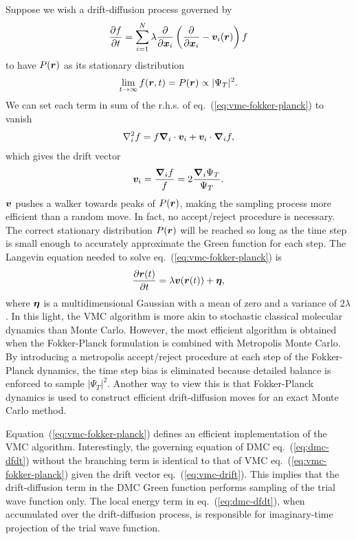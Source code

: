 Suppose we wish a drift-diffusion process governed by
\begin{align} \label{eq:vmc-fokker-planck}
\dfrac{\partial f}{\partial t} = \sum\limits_{i=1}^N \lambda\dfrac{\partial}{\partial\boldsymbol{x}_i}\left(
\dfrac{\partial}{\partial\boldsymbol{x}_i} -\boldsymbol{v}_i(\boldsymbol{r})
\right)f
\end{align}
to have $P(\boldsymbol{r})$ as its stationary distribution
\begin{align}
\lim\limits_{t\rightarrow\infty} f(\boldsymbol{r},t) = P(\boldsymbol{r}) \propto \vert\Psi_T\vert^2.
\end{align}
We can set each term in sum of the r.h.s. of eq.~(\ref{eq:vmc-fokker-planck}) to vanish
\begin{align}
\nabla_i^2 f = f\boldsymbol{\nabla}_i\cdot\boldsymbol{v}_i + \boldsymbol{v}_i\cdot\boldsymbol{\nabla}_if,
\end{align}
which gives the drift vector
\begin{align} \label{eq:vmc-drift}
\boldsymbol{v}_i = \dfrac{\boldsymbol{\nabla}_if}{f} = 2\dfrac{\boldsymbol{\nabla}_i\Psi_T}{\Psi_T}.
\end{align}
$\boldsymbol{v}$ pushes a walker towards peaks of $P(\boldsymbol{r})$, making the sampling process more efficient than a random move.
In fact, no accept/reject procedure is necessary.
The correct stationary distribution $P(\boldsymbol{r})$ will be reached so long as the time step is small enough to accurately approximate the Green function for each step.
The Langevin equation needed to solve eq.~(\ref{eq:vmc-fokker-planck}) is
\begin{align}
\dfrac{\partial\boldsymbol{r}(t)}{\partial t} = \lambda \boldsymbol{v}(\boldsymbol{r}(t)) + \boldsymbol{\eta},
\end{align}
where $\boldsymbol{\eta}$ is a multidimensional Gaussian with a mean of zero and a variance of $2\lambda$. In this light, the VMC algorithm is more akin to stochastic classical molecular dynamics than Monte Carlo. However, the most efficient algorithm is obtained when the Fokker-Planck formulation is combined with Metropolis Monte Carlo. By introducing a metropolis accept/reject procedure at each step of the Fokker-Planck dynamics, the time step bias is eliminated because detailed balance is enforced to sample $\vert\Psi_T\vert^2$. Another way to view this is that Fokker-Planck dynamics is used to construct efficient drift-diffusion moves for an exact Monte Carlo method.

Equation~(\ref{eq:vmc-fokker-planck}) defines an efficient implementation of the VMC algorithm. Interestingly, the governing equation of DMC eq.~(\ref{eq:dmc-dfdt}) without the branching term is identical to that of VMC eq.~(\ref{eq:vmc-fokker-planck}) given the drift vector eq.~(\ref{eq:vmc-drift}).
This implies that the drift-diffusion term in the DMC Green function performs sampling of the trial wave function only. The local energy term in eq.~(\ref{eq:dmc-dfdt}), when accumulated over the drift-diffusion process, is responsible for imaginary-time projection of the trial wave function.

